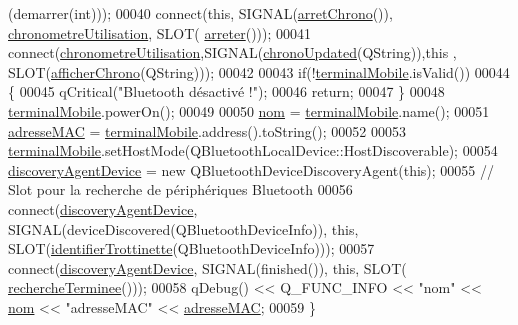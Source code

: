 \begin{DoxyCode}
      (demarrer(\textcolor{keywordtype}{int})));
00040     connect(\textcolor{keyword}{this}, SIGNAL(\hyperlink{class_peripherique_local_a150599c1ded2462eb0e2d1d943459a34}{arretChrono}()), \hyperlink{class_peripherique_local_a89e0515901920b03e83066cf306f7f14}{chronometreUtilisation}, SLOT(
      \hyperlink{class_peripherique_local_afbbb6d37b616cc4579486c3b1ce700b2}{arreter}()));
00041     connect(\hyperlink{class_peripherique_local_a89e0515901920b03e83066cf306f7f14}{chronometreUtilisation},SIGNAL(\hyperlink{class_peripherique_local_a8900d04b38a366bf786d608a741d2dc0}{chronoUpdated}(QString)),\textcolor{keyword}{this} ,
       SLOT(\hyperlink{class_peripherique_local_af567be15ff8eb2a00cb4e0674ebf3004}{afficherChrono}(QString)));
00042 
00043     \textcolor{keywordflow}{if}(!\hyperlink{class_peripherique_local_a515044c46ba91db8d0b29362226860aa}{terminalMobile}.isValid())
00044      \{
00045          qCritical(\textcolor{stringliteral}{"Bluetooth désactivé !"});
00046          \textcolor{keywordflow}{return};
00047      \}
00048     \hyperlink{class_peripherique_local_a515044c46ba91db8d0b29362226860aa}{terminalMobile}.powerOn();
00049 
00050     \hyperlink{class_peripherique_local_a16dcebf91bf74b8e3f1c2d90b77dda29}{nom} = \hyperlink{class_peripherique_local_a515044c46ba91db8d0b29362226860aa}{terminalMobile}.name();
00051     \hyperlink{class_peripherique_local_a76ccdcef703e7aff1f6f66dc615feba7}{adresseMAC} = \hyperlink{class_peripherique_local_a515044c46ba91db8d0b29362226860aa}{terminalMobile}.address().toString();    
00052 
00053     \hyperlink{class_peripherique_local_a515044c46ba91db8d0b29362226860aa}{terminalMobile}.setHostMode(QBluetoothLocalDevice::HostDiscoverable);
00054     \hyperlink{class_peripherique_local_a9e398b7dd89a20b1bee67b8c3467da69}{discoveryAgentDevice} = \textcolor{keyword}{new} QBluetoothDeviceDiscoveryAgent(\textcolor{keyword}{this});
00055     \textcolor{comment}{//  Slot  pour  la  recherche  de  périphériques  Bluetooth}
00056     connect(\hyperlink{class_peripherique_local_a9e398b7dd89a20b1bee67b8c3467da69}{discoveryAgentDevice}, SIGNAL(deviceDiscovered(QBluetoothDeviceInfo)), \textcolor{keyword}{this},
       SLOT(\hyperlink{class_peripherique_local_aab3b5a9b584b0191b9f690add1cfa6ed}{identifierTrottinette}(QBluetoothDeviceInfo)));
00057     connect(\hyperlink{class_peripherique_local_a9e398b7dd89a20b1bee67b8c3467da69}{discoveryAgentDevice}, SIGNAL(finished()), \textcolor{keyword}{this}, SLOT(
      \hyperlink{class_peripherique_local_a16add86080e72a5ce804ff9296e10415}{rechercheTerminee}()));
00058     qDebug() << Q\_FUNC\_INFO << \textcolor{stringliteral}{"nom"} << \hyperlink{class_peripherique_local_a16dcebf91bf74b8e3f1c2d90b77dda29}{nom} << \textcolor{stringliteral}{"adresseMAC"} << \hyperlink{class_peripherique_local_a76ccdcef703e7aff1f6f66dc615feba7}{adresseMAC};
00059 \}
\end{DoxyCode}


